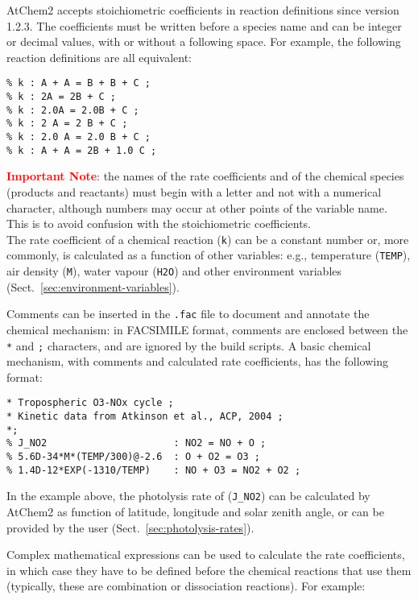 AtChem2 accepts stoichiometric coefficients in reaction definitions
since version 1.2.3. The coefficients must be written before a species
name and can be integer or decimal values, with or without a following
space. For example, the following reaction definitions are all
equivalent:

\begin{verbatim}
% k : A + A = B + B + C ;
% k : 2A = 2B + C ;
% k : 2.0A = 2.0B + C ;
% k : 2 A = 2 B + C ;
% k : 2.0 A = 2.0 B + C ;
% k : A + A = 2B + 1.0 C ;
\end{verbatim}

\textcolor{red}{\bf Important Note}: the names of the rate
coefficients and of the chemical species (products and reactants) must
begin with a letter and not with a numerical character, although
numbers may occur at other points of the variable name. This is to
avoid confusion with the stoichiometric coefficients.\\

The rate coefficient of a chemical reaction (\texttt{k}) can be a
constant number or, more commonly, is calculated as a function of
other variables: e.g., temperature (\texttt{TEMP}), air density
(\texttt{M}), water vapour (\texttt{H2O}) and other environment
variables (Sect.~\ref{sec:environment-variables}).

Comments can be inserted in the \texttt{.fac} file to document and
annotate the chemical mechanism: in FACSIMILE format, comments are
enclosed between the \texttt{*} and \texttt{;} characters, and are
ignored by the build scripts. A basic chemical mechanism, with
comments and calculated rate coefficients, has the following format:

\begin{verbatim}
* Tropospheric O3-NOx cycle ;
* Kinetic data from Atkinson et al., ACP, 2004 ;
*;
% J_NO2                      : NO2 = NO + O ;
% 5.6D-34*M*(TEMP/300)@-2.6  : O + O2 = O3 ;
% 1.4D-12*EXP(-1310/TEMP)    : NO + O3 = NO2 + O2 ;
\end{verbatim}

In the example above, the photolysis rate of 
(\texttt{J\_NO2}) can be calculated by AtChem2 as function of
latitude, longitude and solar zenith angle, or can be provided
by the user (Sect.~\ref{sec:photolysis-rates}).

Complex mathematical expressions can be used to calculate the rate
coefficients, in which case they have to be defined before the
chemical reactions that use them (typically, these are combination
or dissociation reactions). For example:

